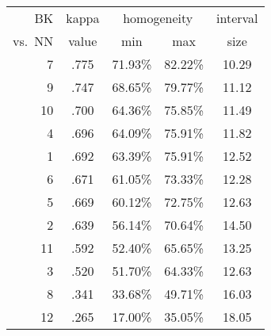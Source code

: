 \begin{tabular}{r|crrc}
\hline
BK & kappa & \multicolumn{2}{c}{homogeneity} & interval \\
vs.~NN & value & \multicolumn{1}{c}{min} & \multicolumn{1}{c}{max} & size \\
\hline
7 & .775 &  71.93\%  &  82.22\%  &  10.29 \\
9 & .747 &  68.65\%  &  79.77\%  &  11.12 \\
\hline
10& .700 &  64.36\%  &  75.85\%  &  11.49 \\
4 & .696 &  64.09\%  &  75.91\%  &  11.82  \\
1 & .692 &  63.39\%  &  75.91\%  &  12.52  \\
6 & .671 &  61.05\%  &  73.33\%  &  12.28  \\
5 & .669 &  60.12\%  &  72.75\%  &  12.63 \\
2 & .639 &  56.14\%  &  70.64\%  &  14.50 \\
11& .592 &  52.40\%  &  65.65\%  &  13.25 \\
3 & .520 &  51.70\%  &  64.33\%  &  12.63  \\
\hline
8 & .341 &  33.68\%  &  49.71\%  &  16.03 \\ 
12& .265 &  17.00\%  &  35.05\%  &  18.05 
\end{tabular}
